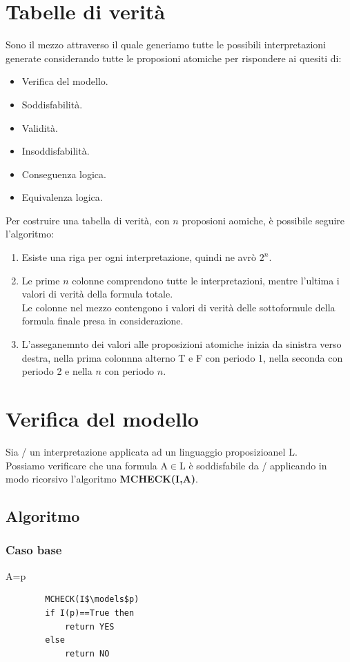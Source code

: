 \documentclass[../main.tex]{subfiles}
\begin{document}
    \section{Tabelle di verità}
    Sono il mezzo attraverso il quale generiamo tutte le possibili interpretazioni generate considerando tutte le proposioni atomiche per rispondere ai quesiti di:
    \begin{itemize}
        \item Verifica del modello.
        \item Soddisfabilità.
        \item Validità.
        \item Insoddisfabilità.
        \item Conseguenza logica.
        \item Equivalenza logica.
    \end{itemize}
    Per costruire una tabella di verità, con $n$ proposioni aomiche, è possibile seguire l'algoritmo:
    \begin{enumerate}
        \item Esiste una riga per ogni interpretazione, quindi ne avrò $2^n$.
        \item Le prime $n$ colonne comprendono tutte le interpretazioni, mentre l'ultima i valori di verità della formula totale.\\
            Le colonne nel mezzo contengono i valori di verità delle sottoformule della formula finale presa in considerazione.
        \item L'asseganemnto dei valori alle proposizioni atomiche inizia da sinistra verso destra, nella prima colonnna alterno T e F con periodo 1, nella seconda con periodo 2 e nella $n$ con periodo $n$.
    \end{enumerate}

    \section{Verifica del modello}
    Sia / un interpretazione applicata ad un linguaggio proposizioanel L.\\
    Possiamo verificare che una formula A$\in$L è soddisfabile da / applicando in modo ricorsivo l'algoritmo \textbf{MCHECK(I,A)}.

    \subsection{Algoritmo}
    \subsubsection{Caso base}
    A=p
    \begin{lstlisting}
        MCHECK(I$\models$p)
        if I(p)==True then
            return YES
        else
            return NO
    \end{lstlisting}
\end{document}
